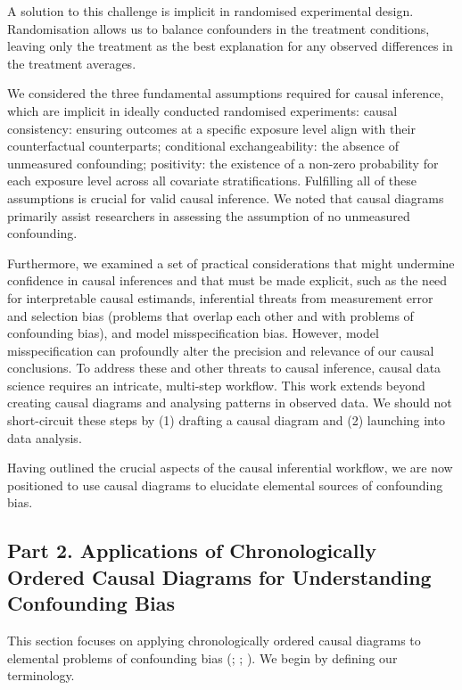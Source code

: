 \documentclass[
  singlecolumn,
  9pt]{article}
\begin{document}
A solution to this challenge is implicit in randomised experimental
design. Randomisation allows us to balance confounders in the treatment
conditions, leaving only the treatment as the best explanation for any
observed differences in the treatment averages.

We considered the three fundamental assumptions required for causal
inference, which are implicit in ideally conducted randomised
experiments: causal consistency: ensuring outcomes at a specific
exposure level align with their counterfactual counterparts; conditional
exchangeability: the absence of unmeasured confounding; positivity: the
existence of a non-zero probability for each exposure level across all
covariate stratifications. Fulfilling all of these assumptions is
crucial for valid causal inference. We noted that causal diagrams
primarily assist researchers in assessing the assumption of no
unmeasured confounding.

Furthermore, we examined a set of practical considerations that might
undermine confidence in causal inferences and that must be made
explicit, such as the need for interpretable causal estimands,
inferential threats from measurement error and selection bias (problems
that overlap each other and with problems of confounding bias), and
model misspecification bias. However, model misspecification can
profoundly alter the precision and relevance of our causal conclusions.
To address these and other threats to causal inference, causal data
science requires an intricate, multi-step workflow. This work extends
beyond creating causal diagrams and analysing patterns in observed data.
We should not short-circuit these steps by (1) drafting a causal diagram
and (2) launching into data analysis.

Having outlined the crucial aspects of the causal inferential workflow,
we are now positioned to use causal diagrams to elucidate elemental
sources of confounding bias.

\subsection{Part 2. Applications of Chronologically Ordered Causal
Diagrams for Understanding Confounding
Bias}\label{part-2.-applications-of-chronologically-ordered-causal-diagrams-for-understanding-confounding-bias}

This section focuses on applying chronologically ordered causal diagrams
to elemental problems of confounding bias
(;
; ). We begin by defining our terminology.
\end{document}
